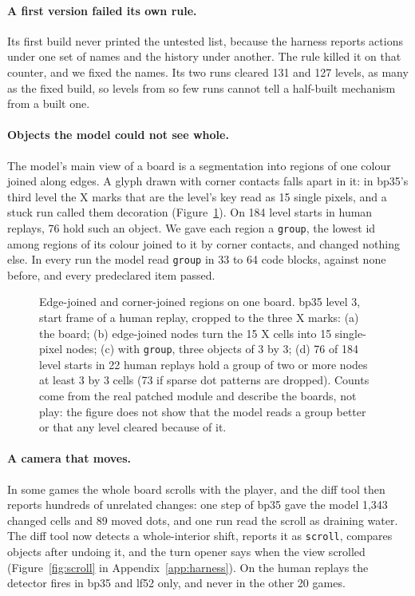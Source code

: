\paragraph{A first version failed its own rule.}
Its first build never printed the untested list, because the harness reports actions under one set of names and the history under another. %
The rule killed it on that counter, and we fixed the names. %
Its two runs cleared 131 and 127 levels, as many as the fixed build, so levels from so few runs cannot tell a half-built mechanism from a built one. %

\paragraph{Objects the model could not see whole.}
The model's main view of a board is a segmentation into regions of one colour joined along edges.
A glyph drawn with corner contacts falls apart in it: in bp35's third level the X marks that are the level's key read as 15 single pixels, and a stuck run called them decoration (Figure~\ref{fig:glyph}). %
On 184 level starts in human replays, 76 hold such an object. %
We gave each region a \texttt{group}, the lowest id among regions of its colour joined to it by corner contacts, and changed nothing else. %
In every run the model read \texttt{group} in 33 to 64 code blocks, against none before, and every predeclared item passed. %

\begin{figure}[t]
\centering
{}
\caption{Edge-joined and corner-joined regions on one board. bp35 level 3, start frame of a human replay, cropped to the three X marks: (a) the board; (b) edge-joined nodes turn the 15 X cells into 15 single-pixel nodes; (c) with \texttt{group}, three objects of 3 by 3; (d) 76 of 184 level starts in 22 human replays hold a group of two or more nodes at least 3 by 3 cells (73 if sparse dot patterns are dropped). Counts come from the real patched module and describe the boards, not play: the figure does not show that the model reads a group better or that any level cleared because of it.}\label{fig:glyph} %
\end{figure}

\paragraph{A camera that moves.}
In some games the whole board scrolls with the player, and the diff tool then reports hundreds of unrelated changes: one step of bp35 gave the model 1,343 changed cells and 89 moved dots, and one run read the scroll as draining water. %
The diff tool now detects a whole-interior shift, reports it as \texttt{scroll}, compares objects after undoing it, and the turn opener says when the view scrolled (Figure~\ref{fig:scroll} in Appendix~\ref{app:harness}). %
On the human replays the detector fires in bp35 and lf52 only, and never in the other 20 games. %


